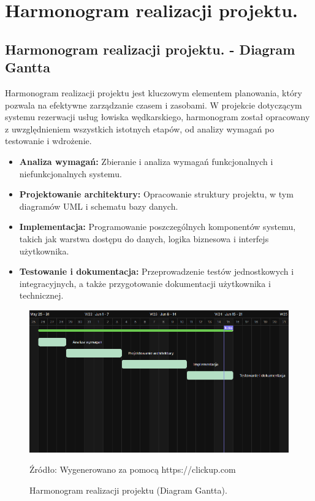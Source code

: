 \chapter{Harmonogram realizacji projektu.}
\label{chap:harmonogram}

\section{Harmonogram realizacji projektu. - Diagram Gantta}
Harmonogram realizacji projektu jest kluczowym elementem planowania, który pozwala na efektywne zarządzanie czasem i zasobami. W projekcie dotyczącym systemu rezerwacji usług łowiska wędkarskiego, harmonogram został opracowany z uwzględnieniem wszystkich istotnych etapów, od analizy wymagań po testowanie i wdrożenie.
\begin {itemize}
    \item \textbf{Analiza wymagań:} Zbieranie i analiza wymagań funkcjonalnych i niefunkcjonalnych systemu.
    \item \textbf{Projektowanie architektury:} Opracowanie struktury projektu, w tym diagramów UML i schematu bazy danych.
    \item \textbf{Implementacja:} Programowanie poszczególnych komponentów systemu, takich jak warstwa dostępu do danych, logika biznesowa i interfejs użytkownika.
    \item \textbf{Testowanie i dokumentacja:} Przeprowadzenie testów jednostkowych i integracyjnych, a także przygotowanie dokumentacji użytkownika i technicznej.
\end{itemize}

\begin{figure}[H]
    \centering
    \includegraphics[width=\linewidth]{figures/gantt.eps}
    \caption{Harmonogram realizacji projektu (Diagram Gantta).}
    \label{fig:gantt_chart}
    \small{Źródło: Wygenerowano za pomocą https://clickup.com}
\end{figure}

